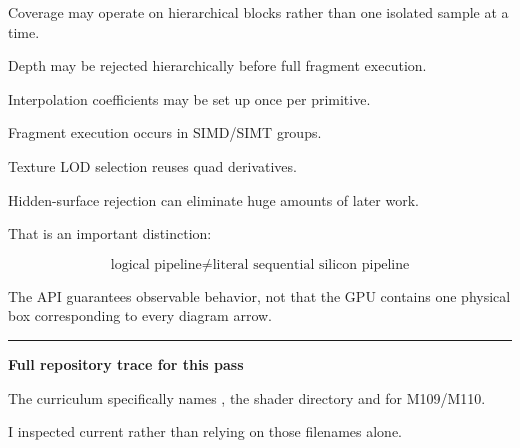 Coverage may operate on hierarchical blocks rather than one isolated sample at a time.

Depth may be rejected hierarchically before full fragment execution.

Interpolation coefficients may be set up once per primitive.

Fragment execution occurs in SIMD/SIMT groups.

Texture LOD selection reuses quad derivatives.

Hidden-surface rejection can eliminate huge amounts of later work.

That is an important distinction:

\[
\boxed{
\text{logical pipeline}
\neq
\text{literal sequential silicon pipeline}
}
\]

The API guarantees observable behavior, not that the GPU contains one physical box corresponding to every diagram arrow.

\begin{center}\rule{0.5\linewidth}{0.5pt}\end{center}

\textbf{Full repository trace for this pass}

The curriculum specifically names , the shader directory and  for M109/M110.

I inspected current  rather than relying on those filenames alone.

